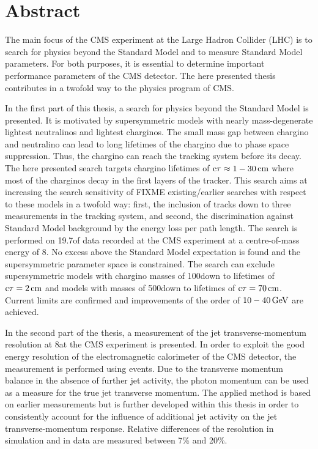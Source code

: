 \chapter*{Abstract}

The main focus of the CMS experiment at the Large Hadron Collider (LHC) is to search for physics beyond the Standard Model and to measure Standard Model parameters.
For both purposes, it is essential to determine important performance parameters of the CMS detector.
The here presented thesis contributes in a twofold way to the physics program of CMS.

In the first part of this thesis, a search for physics beyond the Standard Model is presented.
It is motivated by supersymmetric models with nearly mass-degenerate lightest neutralinos and lightest charginos.
The small mass gap between chargino and neutralino can lead to long lifetimes of the chargino due to phase space suppression.
Thus, the chargino can reach the tracking system before its decay.
The here presented search targets chargino lifetimes of $\text{c}\tau \approx 1 - 30\,\text{cm} $ where most of the charginos decay in the first layers of the tracker. 
This search aims at increasing the search sensitivity of FIXME existing/earlier searches with respect to these models in a twofold way: first, the inclusion of tracks down to three measurements in the tracking system, and second, the discrimination against Standard Model background by the energy loss per path length.
The search is performed on 19.7\fbinv of data recorded at the CMS experiment at a centre-of-mass energy of 8\tev.
No excess above the Standard Model expectation is found and the supersymmetric parameter space is constrained.
The search can exclude supersymmetric models with chargino masses of 100\gev down to lifetimes of $\text{c}\tau=2\,\text{cm}$ and models with masses of 500\gev down to lifetimes of $\text{c}\tau=70\,\text{cm}$.
Current limits are confirmed and improvements of the order of $10-40\,\text{Ge}\kern-0.06667em\text{V}$ are achieved.

In the second part of the thesis, a measurement of the jet transverse-momentum resolution at 8\tev at the CMS experiment is presented.
In order to exploit the good energy resolution of the electromagnetic calorimeter of the CMS detector, the measurement is performed using \GAMJET events.
Due to the transverse momentum balance in the absence of further jet activity, the photon momentum can be used as a measure for the true jet transverse momentum. 
The applied method is based on earlier measurements but is further developed within this thesis in order to consistently account for the influence of additional jet activity on the jet transverse-momentum response.
Relative differences of the resolution in simulation and in data are measured between 7\% and 20\%. 

\cleardoublepage
